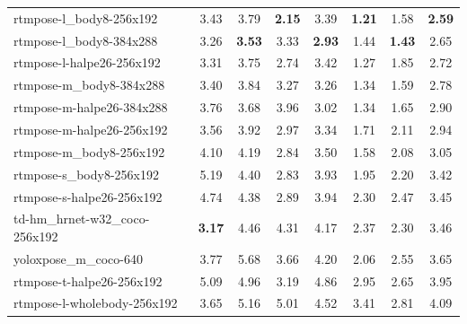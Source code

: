 \begin{table}[htbp]
\begin{tabular}{l ccccccc}
        \midrule
        rtmpose-l\_body8-256x192         & 3.43           & 3.79          & \textbf{2.15} & 3.39              & \textbf{1.21}  & 1.58           & \textbf{2.59} \\
        rtmpose-l\_body8-384x288         & 3.26           & \textbf{3.53} & 3.33          & \textbf{2.93}     & 1.44           & \textbf{1.43}  & 2.65          \\
        rtmpose-l-halpe26-256x192        & 3.31           & 3.75          & 2.74          & 3.42              & 1.27           & 1.85           & 2.72          \\
        rtmpose-m\_body8-384x288         & 3.40           & 3.84          & 3.27          & 3.26              & 1.34           & 1.59           & 2.78          \\
        rtmpose-m-halpe26-384x288        & 3.76           & 3.68          & 3.96          & 3.02              & 1.34           & 1.65           & 2.90          \\
        rtmpose-m-halpe26-256x192        & 3.56           & 3.92          & 2.97          & 3.34              & 1.71           & 2.11           & 2.94          \\
        rtmpose-m\_body8-256x192         & 4.10           & 4.19          & 2.84          & 3.50              & 1.58           & 2.08           & 3.05          \\
        rtmpose-s\_body8-256x192         & 5.19           & 4.40          & 2.83          & 3.93              & 1.95           & 2.20           & 3.42          \\
        rtmpose-s-halpe26-256x192        & 4.74           & 4.38          & 2.89          & 3.94              & 2.30           & 2.47           & 3.45          \\
        td-hm\_hrnet-w32\_coco-256x192   & \textbf{3.17}  & 4.46          & 4.31          & 4.17              & 2.37           & 2.30           & 3.46          \\
        yoloxpose\_m\_coco-640           & 3.77           & 5.68          & 3.66          & 4.20              & 2.06           & 2.55           & 3.65          \\
        rtmpose-t-halpe26-256x192        & 5.09           & 4.96          & 3.19          & 4.86              & 2.95           & 2.65           & 3.95          \\
        rtmpose-l-wholebody-256x192      & 3.65           & 5.16          & 5.01          & 4.52              & 3.41           & 2.81           & 4.09          \\

\end{tabular}
\end{table}
